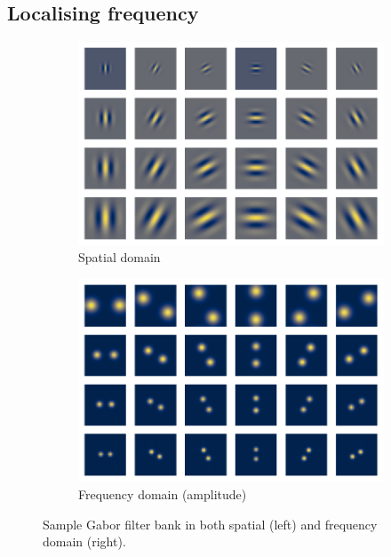 \subsection{Localising frequency}
\begin{figure}
\begin{subfigure}{0.49\textwidth}
	\centering
	\includegraphics[width=1\textwidth]{figures/theory/gabor_sample}
	\caption{Spatial domain}\label{fig:gabor-sample-spatial}
\end{subfigure}
\begin{subfigure}{0.49\textwidth}
	\centering
	\includegraphics[width=1\textwidth]{figures/theory/gabor_sample_f}
	\caption{Frequency domain (amplitude)}\label{fig:gabor-sample-freq}
\end{subfigure}
\caption{Sample Gabor filter bank in both spatial (left) and frequency domain (right).}\label{fig:gabor-sample}
\end{figure}

